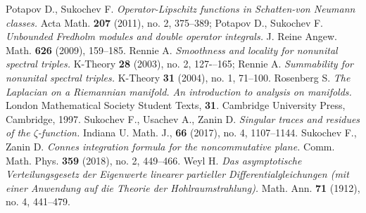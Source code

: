 \documentclass{article}
\begin{document}
\begin{thebibliography}{99}
 Potapov D., Sukochev F. {\it Operator-Lipschitz functions in Schatten-von Neumann classes.} Acta Math. {\bf 207} (2011), no. 2, 375--389; Potapov D., Sukochev F. {\it Unbounded Fredholm modules and double operator integrals.} J. Reine Angew. Math. {\bf 626} (2009), 159--185.
 Rennie A. {\it Smoothness and locality for nonunital spectral triples.} K-Theory {\bf 28} (2003), no. 2, 127-–165; Rennie A. {\it Summability for nonunital spectral triples. } K-Theory {\bf 31} (2004), no. 1, 71--100.
 Rosenberg S. {\it The Laplacian on a Riemannian manifold. An introduction to analysis on manifolds.} London Mathematical Society Student Texts, {\bf 31}. Cambridge University Press, Cambridge, 1997.
 Sukochev F., Usachev A., Zanin D. {\it Singular traces and residues of the $\zeta$-function.} Indiana U. Math. J., {\bf 66} (2017), no. 4, 1107--1144.
 Sukochev F., Zanin D. {\it Connes integration formula for the noncommutative plane.} Comm. Math. Phys. {\bf 359} (2018), no. 2, 449--466.
 Weyl H. {\it Das asymptotische Verteilungsgesetz der Eigenwerte linearer partieller Differentialgleichungen (mit einer Anwendung auf die Theorie der Hohlraumstrahlung).} Math. Ann. {\bf 71} (1912), no. 4, 441--479. 


\end{thebibliography}
\end{document}
